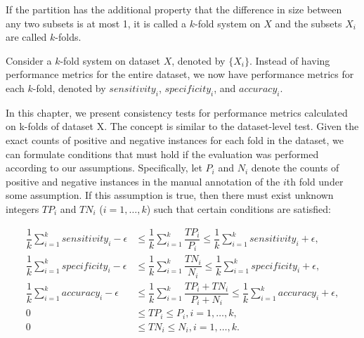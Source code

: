 \documentclass[5p, final]{elsarticle}
\begin{document}
If the partition has the additional property that the difference in size between any two subsets is at most 1, it is called a $k$-fold system on $X$ and the subsets $X_i$ are called $k$-folds.

Consider a $k$-fold system on dataset $X$, denoted by $\{X_i\}$. Instead of having performance metrics for the entire dataset, we now have performance metrics for each $k$-fold, denoted by $sensitivity_i$, $specificity_i$, and $accuracy_i$.

In this chapter, we present consistency tests for performance metrics calculated on k-folds of dataset X. The concept is similar to the dataset-level test. Given the exact counts of positive and negative instances for each fold in the dataset, we can formulate conditions that must hold if the evaluation was performed according to our assumptions. Specifically, let $P_i$ and $N_i$ denote the counts of positive and negative instances in the manual annotation of the $i$th fold under some assumption. If this assumption is true, then there must exist unknown integers $TP_i$ and $TN_i$ ($i=1, \dots, k$) such that certain conditions are satisfied:

\begin{align}
\dfrac{1}{k}\sum\limits_{i=1}^k{sensitivity_i} - \epsilon &\leq \dfrac{1}{k}\sum\limits_{i=1}^{k}\dfrac{TP_i}{P_i} \leq \dfrac{1}{k}\sum\limits_{i=1}^k{sensitivity_i} + \epsilon, \label{cond-sens}\\
\dfrac{1}{k}\sum\limits_{i=1}^k{specificity}_i - \epsilon &\leq \dfrac{1}{k}\sum\limits_{i=1}^{k}\dfrac{TN_i}{N_i} \leq \dfrac{1}{k}\sum\limits_{i=1}^k{specificity}_i + \epsilon, \label{cond-spec}\\
\dfrac{1}{k}\sum\limits_{i=1}^k{accuracy}_i - \epsilon &\leq \dfrac{1}{k}\sum\limits_{i=1}^{k}\dfrac{TP_i + TN_i}{P_i + N_i} \leq \dfrac{1}{k}\sum\limits_{i=1}^k{accuracy}_i + \epsilon, \label{cond-acc}\\
0 &\leq TP_i \leq P_i, i=1, \dots, k, \label{boundary-tp}\\
0 &\leq TN_i \leq N_i, i=1, \dots, k. \label{boundary-tn}
\end{align}
\end{document}
